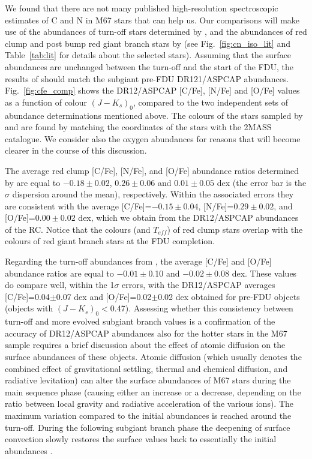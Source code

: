 \documentclass[a4paper,fleqn,usenatbib]{mnras}
\begin{document}
We found that there are not many published high-resolution spectroscopic estimates of C and N in M67 stars that can help us. Our comparisons will make use of the abundances of turn-off stars determined by \citet{shetrone2000}, and the abundances of red clump and post bump red giant branch stars by \citet{tautv2000} (see Fig.~\ref{fig:cn_iso_lit} and Table~\ref{tab:lit} for details about the selected stars). Assuming that the surface abundances are unchanged between the turn-off and the start of the FDU, the results of \citet{shetrone2000} should match the subgiant pre-FDU DR121/ASPCAP abundances.
Fig.~\ref{fig:cfe_comp} shows the DR12/ASPCAP [C/Fe], [N/Fe] and [O/Fe] values as a function of colour $(J-K_s)_0$, compared to the two independent sets of abundance determinations mentioned above. The colours of the stars sampled  by \citet{shetrone2000} and \citet{tautv2000} are found by matching the coordinates of the stars with the 2MASS catalogue.
We consider also the oxygen abundances for reasons that will become clearer in the course of this discussion.

The average red clump [C/Fe], [N/Fe], and [O/Fe] abundance ratios determined by \citet{tautv2000} are equal to $-0.18\pm0.02$,  $0.26\pm0.06$ and $0.01\pm0.05$ dex (the error bar is the $\sigma$ dispersion around the mean), respectively. 
Within the associated errors they are consistent with the average [C/Fe]=$-0.15\pm0.04$, [N/Fe]=$0.29\pm0.02$, and [O/Fe]=$0.00\pm0.02$ dex, which we obtain from the DR12/ASPCAP abundances of the RC. Notice that the colours (and $T_{eff}$) of red clump stars overlap with the colours of red giant branch stars at the FDU completion.

Regarding the turn-off abundances from \citet{shetrone2000}, the average [C/Fe] and [O/Fe] abundance ratios are equal to $-0.01\pm$0.10 and $-0.02\pm$0.08 dex. These values do  compare well, within the 1$\sigma$ errors, with the DR12/ASPCAP averages [C/Fe]=0.04$\pm$0.07 dex and [O/Fe]=0.02$\pm$0.02 dex obtained for pre-FDU objects (objects with $(J-K_s)_0<$0.47).
Assessing whether this consistency between turn-off and more evolved subgiant branch values  is a confirmation of the accuracy of DR12/ASPCAP abundances also for the hotter stars in the M67 sample requires a brief discussion about the effect of atomic diffusion on the surface abundances of these objects. 
Atomic diffusion (which usually denotes the combined effect of gravitational settling, thermal and chemical diffusion, and radiative levitation) can alter the surface abundances of M67 stars during the main sequence phase (causing either an increase or a decrease, 
depending on the ratio between local gravity and radiative acceleration of the various ions). The maximum variation 
compared to the initial abundances is reached around the turn-off. During the following subgiant branch phase 
the deepening of surface convection slowly restores the surface values back to essentially the initial abundances \citep[see, e.g.,][and references therein]{cs13}.
\end{document}
